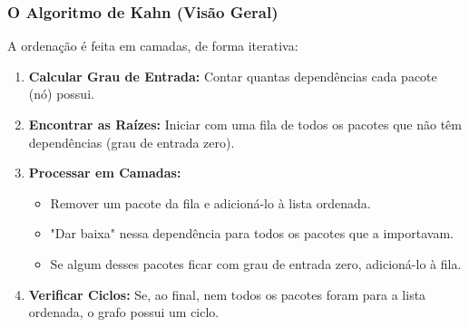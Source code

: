 \documentclass{beamer}
\begin{document}
\begin{frame}
    \frametitle{O Algoritmo de Kahn (Visão Geral)}

    A ordenação é feita em camadas, de forma iterativa:

    \begin{enumerate}
        \item \textbf{Calcular Grau de Entrada:} Contar quantas dependências cada pacote (nó) possui.
        \vspace{0.5cm}
        \item \textbf{Encontrar as Raízes:} Iniciar com uma fila de todos os pacotes que não têm dependências (grau de entrada zero).
        \vspace{0.5cm}
        \item \textbf{Processar em Camadas:}
            \begin{itemize}
                \item Remover um pacote da fila e adicioná-lo à lista ordenada.
                \item "Dar baixa" nessa dependência para todos os pacotes que a importavam.
                \item Se algum desses pacotes ficar com grau de entrada zero, adicioná-lo à fila.
            \end{itemize}
        \vspace{0.5cm}
        \item \textbf{Verificar Ciclos:} Se, ao final, nem todos os pacotes foram para a lista ordenada, o grafo possui um ciclo.
    \end{enumerate}
\end{frame}
\end{document}
